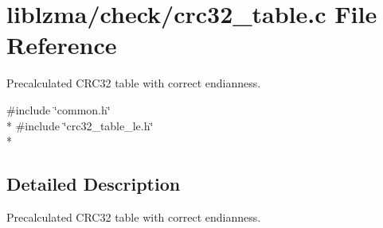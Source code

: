 \section{liblzma/check/crc32\-\_\-table.c File Reference}
\label{crc32__table_8c}


Precalculated C\-R\-C32 table with correct endianness.  


{\ttfamily \#include \char`\"{}common.\-h\char`\"{}}\\*
{\ttfamily \#include \char`\"{}crc32\-\_\-table\-\_\-le.\-h\char`\"{}}\\*


\subsection{Detailed Description}
Precalculated C\-R\-C32 table with correct endianness. 